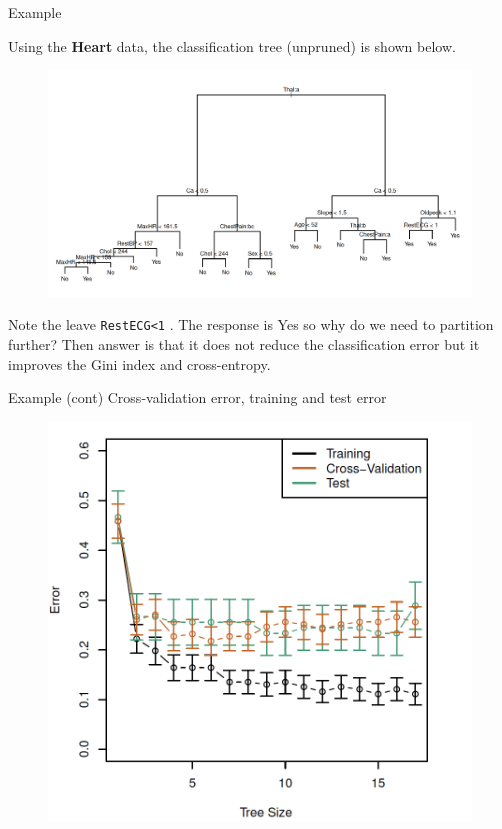\documentclass{beamer}
\begin{document}
\begin{frame}{Example}
	
	Using the {\bf Heart} data, the classification tree (unpruned) is shown below. 
	\begin{figure}[h]
	\centering
	\includegraphics[scale=0.3]{../../Figures/fig_class_tree.png}
\end{figure}	
Note the leave {\tt RestECG<1} . The response is Yes so why do we need to partition further? Then answer is that it does not reduce the classification error but  it improves the Gini index and cross-entropy. 
\end{frame}
	
\begin{frame}{Example (cont)}
	Cross-validation error, training and test error 
	
		\begin{figure}[h]
		\centering
		\includegraphics[scale=0.4]{../../Figures/fig_class_tree_error.png}
	\end{figure}
	
\end{frame}
\end{document}
